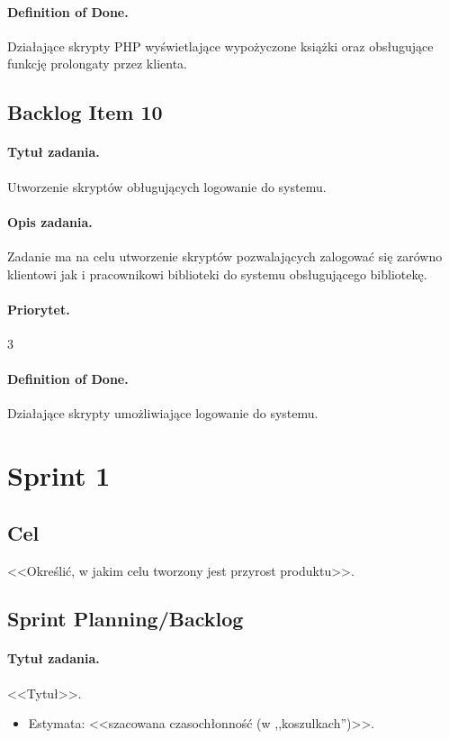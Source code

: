 \documentclass[a4paper]{article}
\begin{document}
\paragraph{Definition of Done.} Działające skrypty PHP wyświetlające wypożyczone książki oraz obsługujące funkcję prolongaty przez klienta.

\subsection{Backlog Item 10}
\paragraph{Tytuł zadania.} Utworzenie skryptów obługujących logowanie do systemu.
\paragraph{Opis zadania.} Zadanie ma na celu utworzenie skryptów pozwalających zalogować się zarówno klientowi jak i pracownikowi biblioteki do systemu obsługującego bibliotekę.
\paragraph{Priorytet.} 3
\paragraph{Definition of Done.} Działające skrypty umożliwiające logowanie do systemu.

\section{Sprint 1}
\subsection{Cel} <<Określić, w jakim celu tworzony jest przyrost produktu>>.
\subsection{Sprint Planning/Backlog}

\paragraph{Tytuł zadania.} <<Tytuł>>.
\begin{itemize}
\item Estymata: <<szacowana czasochłonność (w ,,koszulkach'')>>.
\end{itemize}
\end{document}
